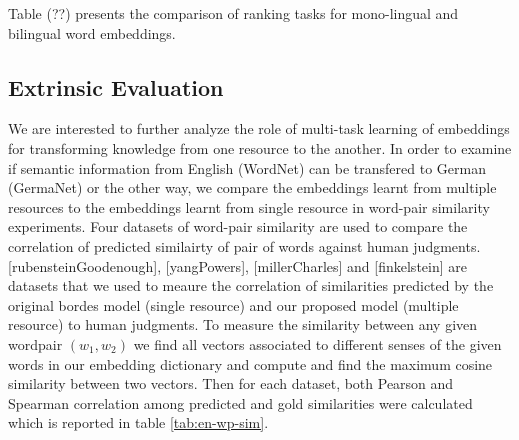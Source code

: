 \documentclass[preprint,12pt]{elsarticle}
\begin{document}
  Table (??) presents
 the comparison of ranking tasks for mono-lingual and bilingual word embeddings.
     
 \FloatBarrier  
 
 \subsection{Extrinsic Evaluation}
 \label{exp:word-similarity}
 We are interested to further analyze the role of multi-task learning of embeddings for transforming knowledge
 from one resource to the another. In order to examine
 if semantic information from English (WordNet) can be transfered to German (GermaNet) or the other way,
 we compare the embeddings learnt from multiple resources to the embeddings learnt from single resource in word-pair similarity experiments.
 Four datasets of word-pair similarity are used to compare the correlation of predicted similairty of pair of words against human judgments.
 [rubensteinGoodenough], [yangPowers], [millerCharles] and [finkelstein] are datasets that we used to meaure the correlation of similarities
 predicted by the original bordes model (single resource) and our proposed model (multiple resource) to human judgments.
 To measure the similarity between any given wordpair $(w_1 , w_2)$ we find all vectors associated to different senses
 of the given words in our embedding dictionary and compute and find the maximum cosine similarity between two vectors.
 Then for each dataset, both Pearson and Spearman correlation among predicted and gold similarities 
 were calculated which is reported in table \ref{tab:en-wp-sim}. 
 
\end{document}
